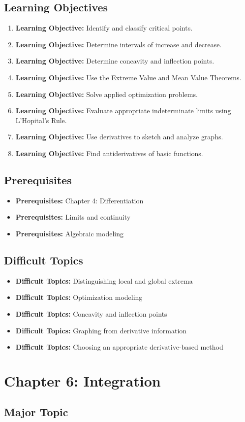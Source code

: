 \documentclass[11pt]{article}
\newcommand{\objective}[1]{\item \textbf{Learning Objective:} #1}
\newcommand{\difficult}[1]{\item \textbf{Difficult Topics:} #1}
\newcommand{\prereq}[1]{\item \textbf{Prerequisites:} #1}
\begin{document}
\subsection{Learning Objectives}

\begin{enumerate}
    \objective{Identify and classify critical points.}
    \objective{Determine intervals of increase and decrease.}
    \objective{Determine concavity and inflection points.}
    \objective{Use the Extreme Value and Mean Value Theorems.}
    \objective{Solve applied optimization problems.}
    \objective{Evaluate appropriate indeterminate limits using
    L'Hopital's Rule.}
    \objective{Use derivatives to sketch and analyze graphs.}
    \objective{Find antiderivatives of basic functions.}
\end{enumerate}

\subsection{Prerequisites}

\begin{itemize}
    \prereq{Chapter 4: Differentiation}
    \prereq{Limits and continuity}
    \prereq{Algebraic modeling}
\end{itemize}

\subsection{Difficult Topics}

\begin{itemize}
    \difficult{Distinguishing local and global extrema}
    \difficult{Optimization modeling}
    \difficult{Concavity and inflection points}
    \difficult{Graphing from derivative information}
    \difficult{Choosing an appropriate derivative-based method}
\end{itemize}


\section{Chapter 6: Integration}

\subsection{Major Topic}
\end{document}
